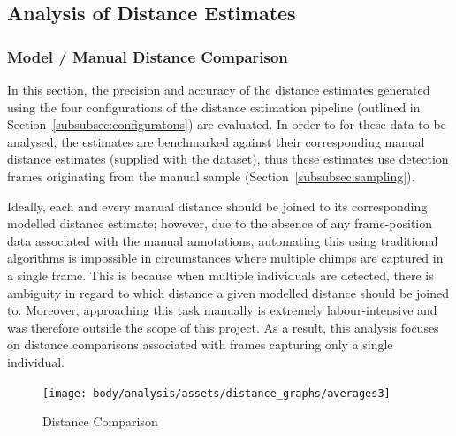 \subsection{Analysis of Distance Estimates}

\subsubsection{Model / Manual Distance Comparison}\label{subsubsec:distance_comparison}

In this section, the precision and accuracy of the distance estimates generated using the
four configurations of the distance estimation pipeline (outlined in
Section~\ref{subsubsec:configuratons}) are evaluated.
In order to for these data to be analysed, the estimates are benchmarked against their
corresponding manual distance estimates (supplied with the dataset), thus these estimates
use detection frames originating from the manual sample (Section~\ref{subsubsec:sampling}).

Ideally, each and every manual distance should be joined to its corresponding modelled
distance estimate; however, due to the absence of any frame-position data associated
with the manual annotations, automating this using traditional algorithms is impossible
in circumstances where multiple chimps are captured in a single frame.
This is because when multiple individuals are detected, there is ambiguity in regard to
which distance a given modelled distance should be joined to.
Moreover, approaching this task manually is extremely labour-intensive and was therefore
outside the scope of this project.
As a result, this analysis focuses on distance comparisons associated with frames capturing
only a single individual.

\begin{figure}[htbp]
    \centering
    \vspace{1cm}
    \texttt{[image: body/analysis/assets/distance\_graphs/averages3]}
    \caption{Distance Comparison}
    \label{fig:distance_comparison}
\end{figure}

\clearpage

